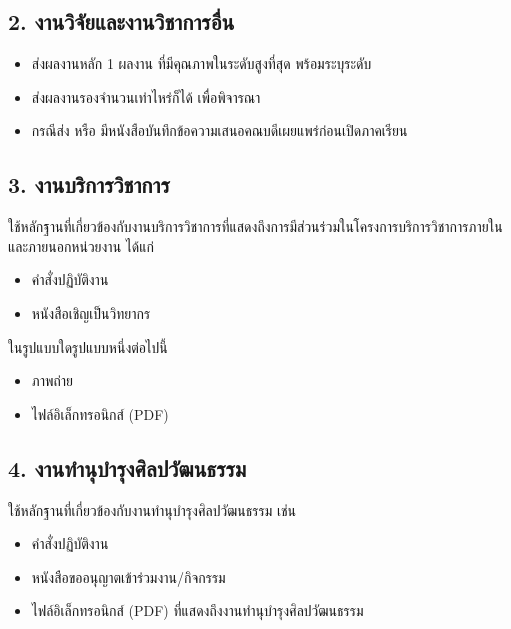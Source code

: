 \documentclass[a4paper,12pt,english]{sphinxmanual}
\begin{document}
\subsection{2. งานวิจัยและงานวิชาการอื่น}
\label{\detokenize{submission_part1:id6}}\begin{itemize}
\item {} 
ส่งผลงานหลัก 1 ผลงาน ที่มีคุณภาพในระดับสูงที่สุด พร้อมระบุระดับ

\item {} 
ส่งผลงานรองจำนวนเท่าไหร่ก็ได้ เพื่อพิจารณา

\item {} 
กรณีส่ง {\hyperref[\detokenize{glossary:term-0}]{}} หรือ {\hyperref[\detokenize{glossary:term-1}]{}}  มีหนังสือบันทึกข้อความเสนอคณบดีเผยแพร่ก่อนเปิดภาคเรียน

\end{itemize}


\subsection{3. งานบริการวิชาการ}
\label{\detokenize{submission_part1:id7}}
ใช้หลักฐานที่เกี่ยวข้องกับงานบริการวิชาการที่แสดงถึงการมีส่วนร่วมในโครงการบริการวิชาการภายในและภายนอกหน่วยงาน ได้แก่
\begin{itemize}
\item {} 
คำสั่งปฏิบัติงาน

\item {} 
หนังสือเชิญเป็นวิทยากร

\end{itemize}

ในรูปแบบใดรูปแบบหนึ่งต่อไปนี้
\begin{itemize}
\item {} 
ภาพถ่าย

\item {} 
ไฟล์อิเล็กทรอนิกส์ (PDF)

\end{itemize}


\subsection{4. งานทำนุบำรุงศิลปวัฒนธรรม}
\label{\detokenize{submission_part1:id8}}
ใช้หลักฐานที่เกี่ยวข้องกับงานทำนุบำรุงศิลปวัฒนธรรม เช่น
\begin{itemize}
\item {} 
คำสั่งปฏิบัติงาน

\item {} 
หนังสือขออนุญาตเข้าร่วมงาน/กิจกรรม

\item {} 
ไฟล์อิเล็กทรอนิกส์ (PDF) ที่แสดงถึงงานทำนุบำรุงศิลปวัฒนธรรม

\end{itemize}
\end{document}
